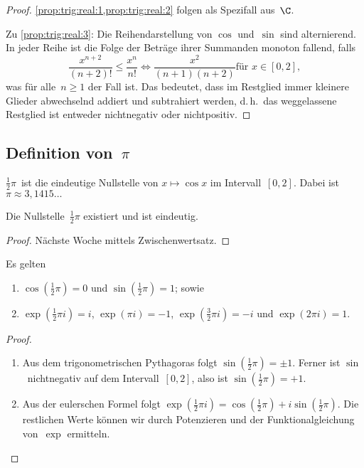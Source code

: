 \documentclass[a4paper]{article}
\begin{document}
\begin{proof}
    \cref{prop:trig:real:1,prop:trig:real:2} folgen als Spezifall aus~$\C$.

    Zu \cref{prop:trig:real:3}: Die Reihendarstellung von $\cos$ und~$\sin$ sind alternierend. In jeder Reihe ist die Folge der Beträge ihrer Summanden monoton fallend, falls
    \begin{equation*}
        \frac{x^{n+2}}{(n+2)!} \leq \frac{x^n}{n!} \iff \frac{x^2}{(n+1)(n+2)} \text{für } x \in [0, 2],
    \end{equation*}
    was für alle~$n \geq 1$ der Fall ist. Das bedeutet, dass im Restglied immer kleinere Glieder abwechselnd addiert und subtrahiert werden, d.\,h.\ das weggelassene Restglied ist entweder nichtnegativ oder nichtpositiv.
\end{proof}

\subsection{Definition von~\texorpdfstring{$\pi$}{Pi}}

\begin{definition}[Kreiszahl]
    $\frac{1}{2}\pi$~ist die eindeutige Nullstelle von $x \mapsto \cos x$ im Intervall~$[0, 2]$. Dabei ist $\pi \approx 3,1415\dots$
\end{definition}

\begin{proposition}\label{prop:pi}
    Die Nullstelle~$\frac{1}{2}\pi$ existiert und ist eindeutig.
\end{proposition}

\begin{proof}
    Nächste Woche mittels Zwischenwertsatz.
\end{proof}

\begin{proposition}\label{prop:pi:functions}
    Es gelten
    \begin{enumerate}
        \item $\cos(\frac{1}{2}\pi) = 0$ und $\sin(\frac{1}{2}\pi) = 1$; sowie
        \item $\exp(\frac{1}{2}\pi i) = i$, $\exp(\pi i) = -1$, $\exp(\frac{3}{2}\pi i) = -i$ und $\exp(2\pi i) = 1$.
    \end{enumerate}
\end{proposition}

\begin{proof}\leavevmode
    \begin{enumerate}
        \item Aus dem trigonometrischen Pythagoras folgt $\sin(\frac{1}{2}\pi) = \pm 1$. Ferner ist $\sin$~nichtnegativ auf dem Intervall~$[0, 2]$, also ist $\sin(\frac{1}{2}\pi) = +1$.
        \item Aus der eulerschen Formel folgt $\exp(\frac{1}{2}\pi i) = \cos(\frac{1}{2}\pi) + i\sin(\frac{1}{2}\pi)$. Die restlichen Werte können wir durch Potenzieren und der Funktionalgleichung von~$\exp$ ermitteln.\qedhere
    \end{enumerate}
\end{proof}
\end{document}

